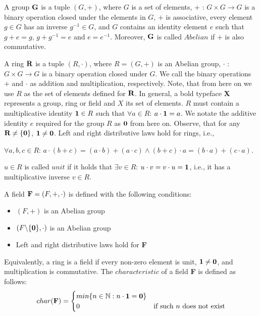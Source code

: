 A group $\textbf G$ is a tuple $(G, +)$, where $G$ is a set of elements, $+$ : $G \times G \longrightarrow G$ is a binary operation closed under 
the elements in $G$, $+$ is associative, every element $g\in G$ has an inverse $g^{-1}\in G$, and $G$ contains 
an identity element $e$ such that $g + e = g$, $g + g^{-1} = e$ and $e = e^{-1}$. Moreover, $\textbf G$ is called $Abelian$ if 
$+$ is also commutative.\nl

A ring $\textbf R$ is a tuple $(R, \cdot )$, where $R = (G, +)$ is an Abelian group, $\cdot$ : $G \times G \longrightarrow G$ 
is a binary operation closed under $G$. We call the binary operations $+$ and $\cdot$ as addition and multiplication, respectively. 
Note, that from here on we use $R$ as the set of elements defined for $\textbf R$. 
In general, a bold typeface \textbf X represents a group, ring or field and $X$ its set of elements. 
$R$ must contain a multiplicative identity $\textbf 1 \in R$ such that $\forall a \in R$: $a \cdot \textbf 1 = a$. 
We notate the additive identity $e$ required for the group $R$ as $\textbf 0$ from here on. 
Observe, that for any $\textbf R \neq \{\textbf 0\}$, $\textbf 1 \neq \textbf 0$.  
Left and right distributive laws hold for rings, i.e., 
\begin{center}
  $\forall a, b, c \in R$: $a \cdot (b + c) = (a \cdot b) + (a \cdot c) \land (b + c) \cdot a = (b \cdot a) + (c \cdot a)$.
\end{center}
$u \in R$ is called $unit$ if it holds that $\exists v \in R$: $u \cdot v = v \cdot u = \textbf 1$, 
i.e., it has a multiplicative inverse $v \in R$.\nl

A field $\textbf F = (F, +, \cdot)$ is defined with the following conditions:
\begin{itemize}
  \item $(F, +)$ is an Abelian group
  \item $(F\backslash \{\textbf 0\}, \cdot )$ is an Abelian group
  \item Left and right distributive laws hold for \textbf F
\end{itemize}

Equivalently, a ring is a field if every non-zero element is unit, $\textbf 1 \neq \textbf 0$, and multiplication is commutative. 
The $characteristic$ of a field \textbf F is defined as follows:
  \begin{equation}
    char(\textbf F) =
      \begin{cases}
        min\{n \in \mathbb N : n \cdot \textbf 1 = \textbf 0 \}\\
        0 & \text{if such $n$ does not exist}\\
      \end{cases}       
  \end{equation}

